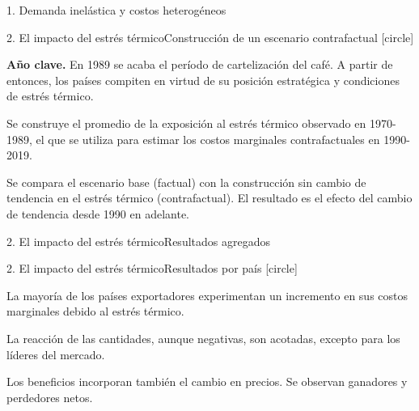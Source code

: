 \begin{frame}{1. Demanda inelástica y costos heterogéneos}
    \vspace{0.2cm}
\label{frame:est_costs_y}
    \hyperlink{frame:ajuste_modelo}{}
    

\end{frame}

\begin{frame}{2. El impacto del estrés térmico}{Construcción de un escenario contrafactual}
    [circle]
    \begin{wideitemize}
        \item <1-> \textbf{Año clave.} En 1989 se acaba el período de cartelización del café. A partir de entonces, los países compiten en virtud de su posición estratégica y condiciones de estrés térmico.
        
        \item <2-> Se construye el promedio de la exposición al estrés térmico observado en 1970-1989, el que se utiliza para estimar los costos marginales contrafactuales en 1990-2019.
        
        \item <3-> Se compara el escenario base (factual) con la construcción sin cambio de tendencia en el estrés térmico (contrafactual). El resultado es el efecto del cambio de tendencia desde 1990 en adelante.
    \end{wideitemize}
    
\end{frame}

\begin{frame}{2. El impacto del estrés térmico}{Resultados agregados}




\end{frame}

\begin{frame}{2. El impacto del estrés térmico}{Resultados por país}
    \label{frame:hallazgo2}
    [circle]
    \begin{wideitemize}
        \item <1-> La mayoría de los países exportadores experimentan un incremento en sus costos marginales debido al estrés térmico. \hyperlink{frame:diff_heat_diff_costs}{}
        
        \vspace{0.5cm}
        \item <2-> La reacción de las cantidades, aunque negativas, son acotadas, excepto para los líderes del mercado. \hyperlink{frame:diff_costs_diff_qe}{}
        
        \vspace{0.5cm}
        \item <3-> Los beneficios incorporan también el cambio en precios. Se observan ganadores y perdedores netos. \hyperlink{frame:diff_costs_diff_profit}{}
    \end{wideitemize}
\end{frame}

